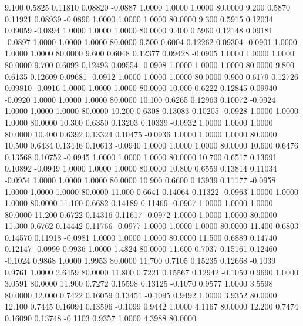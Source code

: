    9.100   0.5825   0.11810   0.08820  -0.0887   1.0000   1.0000   1.0000  80.0000
   9.200   0.5870   0.11921   0.08939  -0.0890   1.0000   1.0000   1.0000  80.0000
   9.300   0.5915   0.12034   0.09059  -0.0894   1.0000   1.0000   1.0000  80.0000
   9.400   0.5960   0.12148   0.09181  -0.0897   1.0000   1.0000   1.0000  80.0000
   9.500   0.6004   0.12262   0.09304  -0.0901   1.0000   1.0000   1.0000  80.0000
   9.600   0.6048   0.12377   0.09428  -0.0905   1.0000   1.0000   1.0000  80.0000
   9.700   0.6092   0.12493   0.09554  -0.0908   1.0000   1.0000   1.0000  80.0000
   9.800   0.6135   0.12609   0.09681  -0.0912   1.0000   1.0000   1.0000  80.0000
   9.900   0.6179   0.12726   0.09810  -0.0916   1.0000   1.0000   1.0000  80.0000
  10.000   0.6222   0.12845   0.09940  -0.0920   1.0000   1.0000   1.0000  80.0000
  10.100   0.6265   0.12963   0.10072  -0.0924   1.0000   1.0000   1.0000  80.0000
  10.200   0.6308   0.13083   0.10205  -0.0928   1.0000   1.0000   1.0000  80.0000
  10.300   0.6350   0.13203   0.10339  -0.0932   1.0000   1.0000   1.0000  80.0000
  10.400   0.6392   0.13324   0.10475  -0.0936   1.0000   1.0000   1.0000  80.0000
  10.500   0.6434   0.13446   0.10613  -0.0940   1.0000   1.0000   1.0000  80.0000
  10.600   0.6476   0.13568   0.10752  -0.0945   1.0000   1.0000   1.0000  80.0000
  10.700   0.6517   0.13691   0.10892  -0.0949   1.0000   1.0000   1.0000  80.0000
  10.800   0.6559   0.13814   0.11034  -0.0954   1.0000   1.0000   1.0000  80.0000
  10.900   0.6600   0.13939   0.11177  -0.0958   1.0000   1.0000   1.0000  80.0000
  11.000   0.6641   0.14064   0.11322  -0.0963   1.0000   1.0000   1.0000  80.0000
  11.100   0.6682   0.14189   0.11469  -0.0967   1.0000   1.0000   1.0000  80.0000
  11.200   0.6722   0.14316   0.11617  -0.0972   1.0000   1.0000   1.0000  80.0000
  11.300   0.6762   0.14442   0.11766  -0.0977   1.0000   1.0000   1.0000  80.0000
  11.400   0.6803   0.14570   0.11918  -0.0981   1.0000   1.0000   1.0000  80.0000
  11.500   0.6889   0.14740   0.12147  -0.0999   0.9936   1.0000   1.4824  80.0000
  11.600   0.7037   0.15161   0.12460  -0.1024   0.9868   1.0000   1.9953  80.0000
  11.700   0.7105   0.15235   0.12668  -0.1039   0.9761   1.0000   2.6459  80.0000
  11.800   0.7221   0.15567   0.12942  -0.1059   0.9690   1.0000   3.0591  80.0000
  11.900   0.7272   0.15598   0.13125  -0.1070   0.9577   1.0000   3.5598  80.0000
  12.000   0.7422   0.16059   0.13451  -0.1095   0.9492   1.0000   3.9352  80.0000
  12.100   0.7445   0.16094   0.13596  -0.1099   0.9442   1.0000   4.1167  80.0000
  12.200   0.7474   0.16090   0.13748  -0.1103   0.9357   1.0000   4.3988  80.0000
